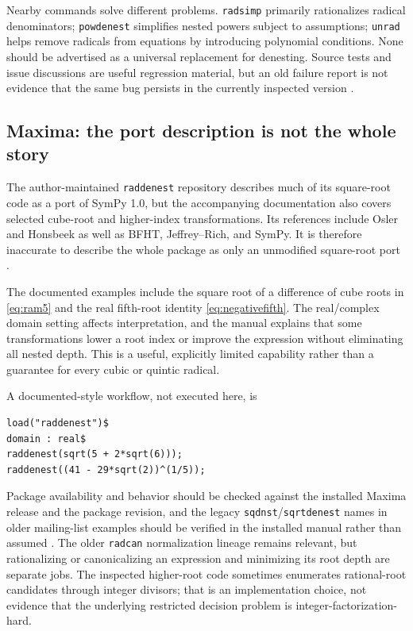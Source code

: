 \documentclass[11pt,oneside]{article}
\numberwithin{equation}{section}
\theoremstyle{definition}
\theoremstyle{remark}
\begin{document}
Nearby commands solve different problems. \texttt{radsimp} primarily rationalizes radical denominators; \texttt{powdenest} simplifies nested powers subject to assumptions; \texttt{unrad} helps remove radicals from equations by introducing polynomial conditions. None should be advertised as a universal replacement for denesting. Source tests and issue discussions are useful regression material, but an old failure report is not evidence that the same bug persists in the currently inspected version \cite{sympy,sympysource,sympyissues}.

\subsection{Maxima: the port description is not the whole story}
The author-maintained \texttt{raddenest} repository describes much of its square-root code as a port of SymPy 1.0, but the accompanying documentation also covers selected cube-root and higher-index transformations. Its references include Osler and Honsbeek as well as BFHT, Jeffrey--Rich, and SymPy. It is therefore inaccurate to describe the whole package as only an unmodified square-root port \cite{maxima}.

The documented examples include the square root of a difference of cube roots in \eqref{eq:ram5} and the real fifth-root identity \eqref{eq:negativefifth}. The real/complex domain setting affects interpretation, and the manual explains that some transformations lower a root index or improve the expression without eliminating all nested depth. This is a useful, explicitly limited capability rather than a guarantee for every cubic or quintic radical.

A documented-style workflow, not executed here, is
\begin{lstlisting}
load("raddenest")$
domain : real$
raddenest(sqrt(5 + 2*sqrt(6)));
raddenest((41 - 29*sqrt(2))^(1/5));
\end{lstlisting}
Package availability and behavior should be checked against the installed Maxima release and the package revision, and the legacy \texttt{sqdnst}/\texttt{sqrtdenest} names in older mailing-list examples should be verified in the installed manual rather than assumed \cite{maximamanual,maximathread}. The older \texttt{radcan} normalization lineage remains relevant, but rationalizing or canonicalizing an expression and minimizing its root depth are separate jobs. The inspected higher-root code sometimes enumerates rational-root candidates through integer divisors; that is an implementation choice, not evidence that the underlying restricted decision problem is integer-factorization-hard.
\end{document}
